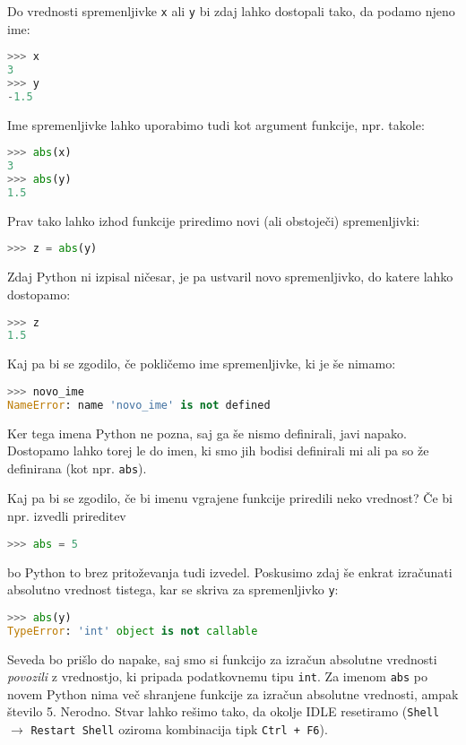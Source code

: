 Do vrednosti spremenljivke \texttt{x} ali \texttt{y} bi zdaj lahko dostopali tako, da podamo njeno ime:
\begin{lstlisting}[language=Python, showstringspaces=false]
>>> x
3
>>> y
-1.5
\end{lstlisting}
Ime spremenljivke lahko uporabimo tudi kot argument funkcije, npr. takole:
\begin{lstlisting}[language=Python, showstringspaces=false]
>>> abs(x)
3
>>> abs(y)
1.5
\end{lstlisting}
Prav tako lahko izhod funkcije priredimo novi (ali obstoječi) spremenljivki:
\begin{lstlisting}[language=Python, showstringspaces=false]
>>> z = abs(y)
\end{lstlisting}
Zdaj Python ni izpisal ničesar, je pa ustvaril novo spremenljivko, do katere lahko dostopamo:
\begin{lstlisting}[language=Python, showstringspaces=false]
>>> z
1.5
\end{lstlisting}
Kaj pa bi se zgodilo, če pokličemo ime spremenljivke, ki je še nimamo:
\begin{lstlisting}[language=Python, showstringspaces=false]
>>> novo_ime
NameError: name 'novo_ime' is not defined
\end{lstlisting}
Ker tega imena Python ne pozna, saj ga še nismo definirali, javi napako. Dostopamo lahko torej le do imen, ki smo jih bodisi definirali mi ali pa so že definirana (kot npr. \texttt{abs}). 

Kaj pa bi se zgodilo, če bi imenu vgrajene funkcije priredili neko vrednost? Če bi npr. izvedli prireditev
\begin{lstlisting}[language=Python, showstringspaces=false]
>>> abs = 5
\end{lstlisting}
bo Python to brez pritoževanja tudi izvedel. Poskusimo zdaj še enkrat izračunati absolutno vrednost tistega, kar se skriva za spremenljivko \texttt{y}:
\begin{lstlisting}[language=Python, showstringspaces=false]
>>> abs(y)
TypeError: 'int' object is not callable
\end{lstlisting}
Seveda bo prišlo do napake, saj smo si funkcijo za izračun absolutne vrednosti \emph{povozili} z vrednostjo, ki pripada podatkovnemu tipu \texttt{int}. Za imenom \texttt{abs} po novem Python nima več shranjene funkcije za izračun absolutne vrednosti, ampak število 5. Nerodno. Stvar lahko rešimo tako, da okolje IDLE resetiramo (\texttt{Shell} $\rightarrow$ \texttt{Restart Shell} oziroma kombinacija tipk \texttt{Ctrl + F6}).

